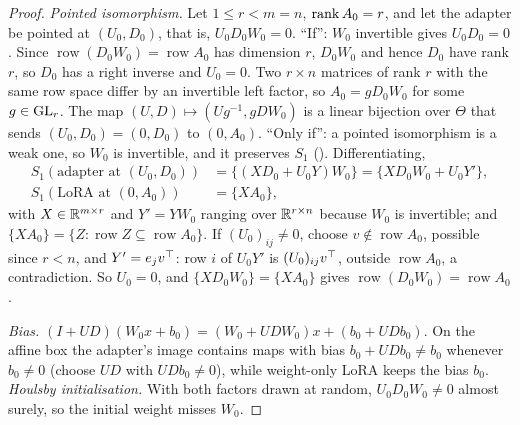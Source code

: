\begin{proof}
\emph{Pointed isomorphism.} Let $1\le r<m=n$, $\operatorname{rank} A_0=r$, and let the adapter be pointed at $(U_0,D_0)$, that is,
$U_0D_0W_0=0$. ``If'': $W_0$ invertible gives $U_0D_0=0$. Since $\operatorname{row}(D_0W_0)=\operatorname{row}A_0$ has dimension
$r$, $D_0W_0$ and hence $D_0$ have rank $r$, so $D_0$ has a right inverse and $U_0=0$. Two $r\times n$ matrices of rank $r$ with
the same row space differ by an invertible left factor, so $A_0=gD_0W_0$ for some $g\in\mathrm{GL}_r$. The map
$(U,D)\mapsto(Ug^{-1},gDW_0)$ is a linear bijection over $\Theta$ that sends $(U_0,D_0)=(0,D_0)$ to $(0,A_0)$. ``Only if'': a
pointed isomorphism is a weak one, so $W_0$ is invertible, and it preserves $S_1$ (). Differentiating,
\begin{align*}
S_1(\text{adapter at }(U_0,D_0))&=\{(XD_0+U_0Y)W_0\}=\{XD_0W_0+U_0Y'\},\\
S_1(\mathrm{LoRA}\text{ at }(0,A_0))&=\{XA_0\},
\end{align*}
with $X\in\mathbb{R}^{m\times r}$ and $Y'=YW_0$ ranging over $\mathbb{R}^{r\times n}$ because $W_0$ is invertible; and $\{XA_0\}=\{Z:
\operatorname{row}Z\subseteq\operatorname{row}A_0\}$. If $(U_0)_{ij}\ne0$, choose $v\notin\operatorname{row}A_0$, possible
since $r<n$, and $Y'=e_jv^{\top}$: row $i$ of $U_0Y'$ is $(U_0)_{ij}v^{\top}$, outside $\operatorname{row}A_0$, a contradiction. So $U_0=0$,
and $\{XD_0W_0\}=\{XA_0\}$ gives $\operatorname{row}(D_0W_0)=\operatorname{row}A_0$.

\emph{Bias.} $(I+UD)(W_0x+b_0)=(W_0+UDW_0)x+(b_0+UDb_0)$. On the affine box the adapter's image contains maps with bias
$b_0+UDb_0\ne b_0$ whenever $b_0\ne0$ (choose $UD$ with $UDb_0\ne0$), while weight-only LoRA keeps the bias $b_0$. \emph{Houlsby
initialisation.} With both factors drawn at random, $U_0D_0W_0\ne0$ almost surely, so the initial weight misses $W_0$.


\end{proof}
